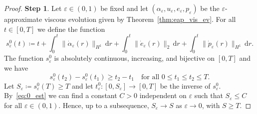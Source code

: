 \documentclass[reqno]{amsart}
\theoremstyle{definition}
\numberwithin{equation}{section}
\def\de {\mathrm{d}}
\begin{document}
\begin{proof}

{\bf Step 1}. Let $\varepsilon\in(0,1)$ be fixed and let $(\alpha_\varepsilon,u_\varepsilon,e_\varepsilon,p_\varepsilon)$ be the $\varepsilon$-approximate viscous evolution given by Theorem~\ref{thm:eap_vis_ev}. For all $t\in[0,T]$ we define the function
$$s_\varepsilon^0(t)\coloneqq t+\int_0^t\|\dot\alpha_\varepsilon(r)\|_{H^1}\,\de r+\int_0^t\|\dot e_\varepsilon(r)\|_2\,\de r+\int_0^t\|\dot p_\varepsilon(r)\|_{H^1}\,\de r.$$
The function $s_\varepsilon^0$ is absolutely continuous, increasing, and bijective on $[0,T]$ and we have
\begin{equation}\label{eq:unif_Lip}
s_\varepsilon^0(t_2)-s_\varepsilon^0(t_1)\ge t_2-t_1\quad\text{for all $0\le t_1\le t_2\le T$}.   
\end{equation}
Let $S_\varepsilon\coloneqq s_\varepsilon^0(T)\ge T$ and let $t_\varepsilon^0\colon [0,S_\varepsilon]\to [0,T]$ be the inverse of $s_\varepsilon^0$. By~\eqref{eq:0_est} we can find a constant $C>0$ independent on $\varepsilon$ such that $S_\varepsilon\le C$ for all $\varepsilon\in(0,1)$. Hence, up to a subsequence, $S_\varepsilon\to S$ as $\varepsilon\to 0$, with $S\ge T$. 


\end{proof}
\end{document}
